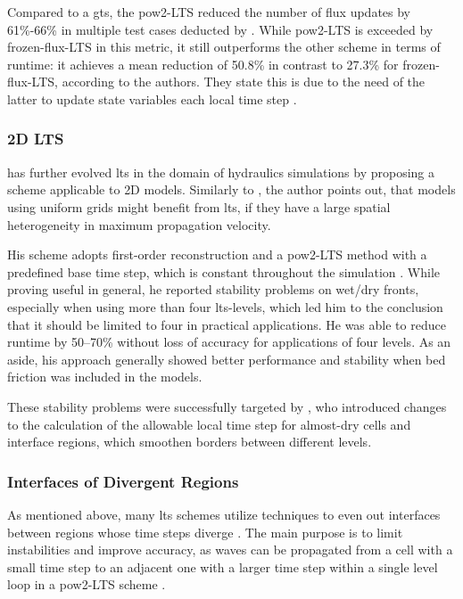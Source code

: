 Compared to a \gls{gts}, the \gls{pow2-LTS} reduced the number of flux updates by 61\%-66\% in multiple test cases deducted by \textcite{crossley2003}.
While \gls{pow2-LTS} is exceeded by \gls{frozen-flux-LTS} in this metric, it still outperforms the other scheme in terms of runtime: it achieves a mean reduction of 50.8\% in contrast to 27.3\% for \gls{frozen-flux-LTS}, according to the authors.
They state this is due to the need of the latter to update state variables each local time step \autocite{crossley2003}.

\subsubsection{2D LTS}

\textcite{sanders2008} has further evolved \gls{lts} in the domain of hydraulics simulations by proposing a scheme applicable to \gls{2D} models.
Similarly to \textcite{crossley2003}, the author points out, that models using uniform grids might benefit from \gls{lts}, if they have a large spatial heterogeneity in maximum propagation velocity.

His scheme adopts first-order reconstruction and a \gls{pow2-LTS} method with a predefined base time step, which is constant throughout the simulation \autocite{sanders2008}.
While proving useful in general, he reported stability problems on wet/dry fronts, especially when using more than four \gls{lts}-levels, which led him to the conclusion that it should be limited to four in practical applications. 
He was able to reduce runtime by 50--70\% without loss of accuracy for applications of four levels.
As an aside, his approach generally showed better performance and stability when bed friction was included in the models.

These stability problems were successfully targeted by \textcite{hu2019}, who introduced changes to the calculation of the allowable local time step for almost-dry cells and interface regions, which smoothen borders between different levels.

\subsubsection{Interfaces of Divergent Regions}\label{sec:LTS-smoothing}

As mentioned above, many \gls{lts} schemes utilize techniques to even out interfaces between regions whose time steps diverge \autocite{crossley2003,sanders2008,dazzi2018,hu2019,yang2020}.
The main purpose is to limit instabilities and improve accuracy, as waves can be propagated from a cell with a small time step to an adjacent one with a larger time step within a single level loop in a \gls{pow2-LTS} scheme \autocite{crossley2003}.

